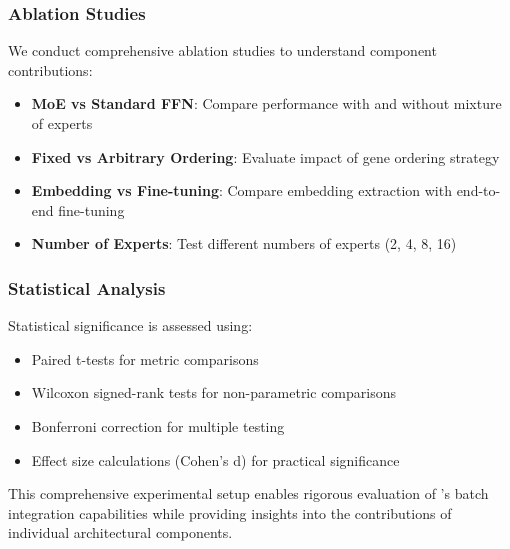 \subsubsection{Ablation Studies}

We conduct comprehensive ablation studies to understand component contributions:

\begin{itemize}
\item \textbf{MoE vs Standard FFN}: Compare performance with and without mixture of experts
\item \textbf{Fixed vs Arbitrary Ordering}: Evaluate impact of gene ordering strategy
\item \textbf{Embedding vs Fine-tuning}: Compare embedding extraction with end-to-end fine-tuning
\item \textbf{Number of Experts}: Test different numbers of experts (2, 4, 8, 16)
\end{itemize}

\subsubsection{Statistical Analysis}

Statistical significance is assessed using:
\begin{itemize}
\item Paired t-tests for metric comparisons
\item Wilcoxon signed-rank tests for non-parametric comparisons
\item Bonferroni correction for multiple testing
\item Effect size calculations (Cohen's d) for practical significance
\end{itemize}

This comprehensive experimental setup enables rigorous evaluation of \bioformer{}'s batch integration capabilities while providing insights into the contributions of individual architectural components.